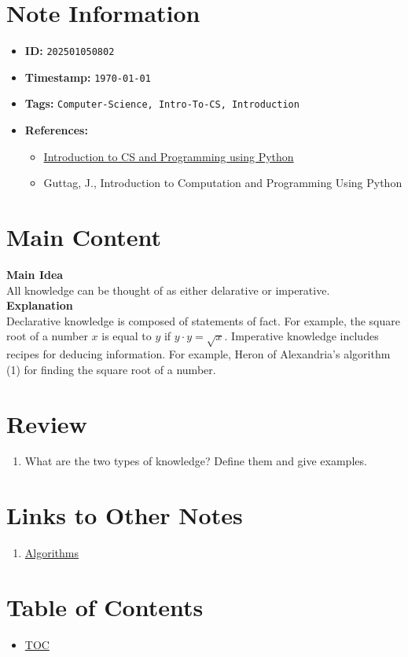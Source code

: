 \clearpage
{}
\label{202501050802}
\renewcommand{\notetitle}{Types of Knowledge}

\section*{Note Information}
\begin{itemize}
  \item \textbf{ID:} \texttt{202501050802}
  \item \textbf{Timestamp:} \texttt{\today \ \currenttime}
  \item \textbf{Tags:} \texttt{Computer-Science, Intro-To-CS, Introduction}
  \item \textbf{References:}
    \begin{itemize}
      \item \href{https://ocw.mit.edu/courses/6-100l-introduction-to-cs-and-programming-using-python-fall-2022/}{Introduction to CS and Programming using Python}
      \item Guttag, J., Introduction to Computation and Programming Using Python
    \end{itemize}
\end{itemize}


\section*{Main Content}
\textbf{Main Idea}\\
All knowledge can be thought of as either delarative or imperative.\\

\textbf{Explanation}\\
Declarative knowledge is composed of statements of fact. For example, the square root of a number $x$ is equal to $y$ if $y \cdot y = \sqrt{x}$.
Imperative knowledge includes recipes for deducing information. For example, Heron of Alexandria's algorithm (1) for finding the square root of a number.\\


\section*{Review}
\begin{enumerate}
  \item What are the two types of knowledge? Define them and give examples. 
\end{enumerate}


\section*{Links to Other Notes}
\begin{enumerate}
  \item \hyperref[202501050821]{Algorithms}
\end{enumerate}

\section*{Table of Contents}
\begin{itemize}
  \item \hyperref[toc]{TOC}
\end{itemize}



